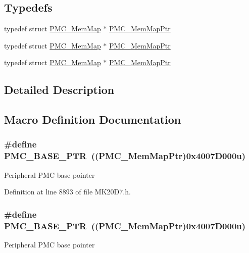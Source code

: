 \subsection*{Typedefs}
\begin{DoxyCompactItemize}
\item 
typedef struct \hyperlink{struct_p_m_c___mem_map}{P\+M\+C\+\_\+\+Mem\+Map} $\ast$ \hyperlink{group___p_m_c___peripheral_ga0e73f22a2fa26cbb012851719e34812e}{P\+M\+C\+\_\+\+Mem\+Map\+Ptr}
\item 
typedef struct \hyperlink{struct_p_m_c___mem_map}{P\+M\+C\+\_\+\+Mem\+Map} $\ast$ \hyperlink{group___p_m_c___peripheral_ga0e73f22a2fa26cbb012851719e34812e}{P\+M\+C\+\_\+\+Mem\+Map\+Ptr}
\item 
typedef struct \hyperlink{struct_p_m_c___mem_map}{P\+M\+C\+\_\+\+Mem\+Map} $\ast$ \hyperlink{group___p_m_c___peripheral_ga0e73f22a2fa26cbb012851719e34812e}{P\+M\+C\+\_\+\+Mem\+Map\+Ptr}
\end{DoxyCompactItemize}


\subsection{Detailed Description}


\subsection{Macro Definition Documentation}
\subsubsection[{\texorpdfstring{P\+M\+C\+\_\+\+B\+A\+S\+E\+\_\+\+P\+TR}{PMC_BASE_PTR}}]{\setlength{\rightskip}{0pt plus 5cm}\#define P\+M\+C\+\_\+\+B\+A\+S\+E\+\_\+\+P\+TR~(({\bf P\+M\+C\+\_\+\+Mem\+Map\+Ptr})0x4007\+D000u)}\hypertarget{group___p_m_c___peripheral_gaf32df9f1096263f10a5e8978a338b2ac}{}\label{group___p_m_c___peripheral_gaf32df9f1096263f10a5e8978a338b2ac}
Peripheral P\+MC base pointer 

Definition at line 8893 of file M\+K20\+D7.\+h.

\subsubsection[{\texorpdfstring{P\+M\+C\+\_\+\+B\+A\+S\+E\+\_\+\+P\+TR}{PMC_BASE_PTR}}]{\setlength{\rightskip}{0pt plus 5cm}\#define P\+M\+C\+\_\+\+B\+A\+S\+E\+\_\+\+P\+TR~(({\bf P\+M\+C\+\_\+\+Mem\+Map\+Ptr})0x4007\+D000u)}\hypertarget{group___p_m_c___peripheral_gaf32df9f1096263f10a5e8978a338b2ac}{}\label{group___p_m_c___peripheral_gaf32df9f1096263f10a5e8978a338b2ac}
Peripheral P\+MC base pointer 

